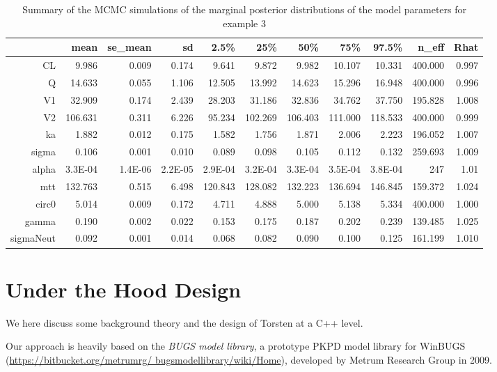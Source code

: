 \documentclass[11pt]{amsart}
\let\oldsection\section
\renewcommand\section{\clearpage\oldsection}
\begin{document}
\begin{table}[ht]
\centering
\caption{Summary of the MCMC simulations of the marginal posterior distributions of the model parameters for example 3}
\begin{tabular}{rrrrrrrrrrr}
  \hline
 & mean & se\_mean & sd & 2.5\% & 25\% & 50\% & 75\% & 97.5\% & n\_eff & Rhat \\ 
  \hline
CL & 9.986 & 0.009 & 0.174 & 9.641 & 9.872 & 9.982 & 10.107 & 10.331 & 400.000 & 0.997 \\
Q & 14.633 & 0.055 & 1.106 & 12.505 & 13.992 & 14.623 & 15.296 & 16.948 & 400.000 & 0.996 \\
V1 & 32.909 & 0.174 & 2.439 & 28.203 & 31.186 & 32.836 & 34.762 & 37.750 & 195.828 & 1.008 \\
V2 & 106.631 & 0.311 & 6.226 & 95.234 & 102.269 & 106.403 & 111.000 & 118.533 & 400.000 & 0.999 \\
ka & 1.882 & 0.012 & 0.175 & 1.582 & 1.756 & 1.871 & 2.006 & 2.223 & 196.052 & 1.007 \\
sigma & 0.106 & 0.001 & 0.010 & 0.089 & 0.098 & 0.105 & 0.112 & 0.132 & 259.693 & 1.009 \\
alpha & 3.3E-04 & 1.4E-06 & 2.2E-05 & 2.9E-04 & 3.2E-04 & 3.3E-04 & 3.5E-04 & 3.8E-04 & 247 & 1.01 \\
mtt & 132.763 & 0.515 & 6.498 & 120.843 & 128.082 & 132.223 & 136.694 & 146.845 & 159.372 & 1.024 \\
circ0 & 5.014 & 0.009 & 0.172 & 4.711 & 4.888 & 5.000 & 5.138 & 5.334 & 400.000 & 1.000 \\
gamma & 0.190 & 0.002 & 0.022 & 0.153 & 0.175 & 0.187 & 0.202 & 0.239 & 139.485 & 1.025 \\
sigmaNeut & 0.092 & 0.001 & 0.014 & 0.068 & 0.082 & 0.090 & 0.100 & 0.125 & 161.199 & 1.010 \\
  \hline
\end{tabular}
\end{table} 
 
 
 

\section{Under the Hood Design}
We here discuss some background theory and the design of Torsten at a C++ level.

Our approach is heavily based on the \textit{BUGS model library}, a prototype PKPD model library for WinBUGS (\url{https://bitbucket.org/metrumrg/ bugsmodellibrary/wiki/Home}), developed by Metrum Research Group in 2009.
\end{document}

